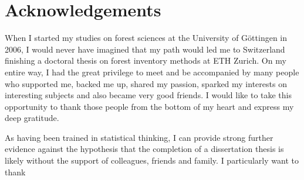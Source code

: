 \chapter*{Acknowledgements}

When I started my studies on forest sciences at the University of G{\"o}ttingen in 2006, I would never have imagined that my path would led me to Switzerland finishing a doctoral thesis on forest inventory methods at ETH Zurich. On my entire way, I had the great privilege to meet and be accompanied by many people who supported me, backed me up, shared my passion, sparked my interests on interesting subjects and also became very good friends. I would like to take this opportunity to thank those people from the bottom of my heart and express my deep gratitude.\par 

As having been trained in statistical thinking, I can provide strong further evidence against the hypothesis that the completion of a dissertation thesis is likely without the support of colleagues, friends and family. I particularly want to thank



